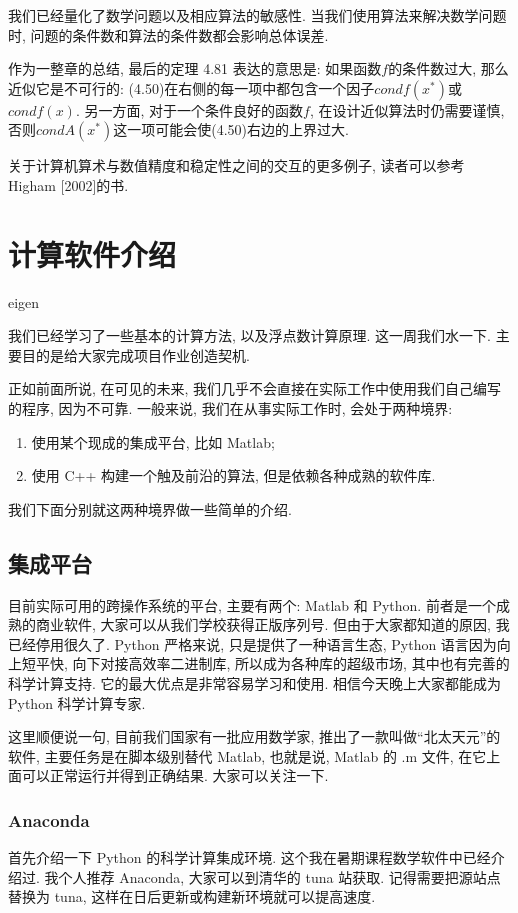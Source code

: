 \documentclass[a4paper]{ctexart}
\begin{document}
{我们已经量化了数学问题以及相应算法的敏感性. 当我们使用算法来解决数学问题时, 
问题的条件数和算法的条件数都会影响总体误差. 

作为一整章的总结, 最后的定理 4.81 表达的意思是: 如果函数$f$的条件数过大, 那么近似它是不可行的: 
(4.50)在右侧的每一项中都包含一个因子$condf(x^*)$或$condf(x)$. 另一方面, 
对于一个条件良好的函数$f$, 在设计近似算法时仍需要谨慎, 否则$condA(x^*)$这一项可能会使(4.50)右边的上界过大.

关于计算机算术与数值精度和稳定性之间的交互的更多例子, 读者可以参考Higham [2002]的书.


\section*{计算软件介绍}

eigen

我们已经学习了一些基本的计算方法, 以及浮点数计算原理. 这一周我们水一下.
主要目的是给大家完成项目作业创造契机.

正如前面所说, 在可见的未来, 我们几乎不会直接在实际工作中使用我们自己编写的程序,
因为不可靠. 一般来说, 我们在从事实际工作时, 会处于两种境界:

\begin{enumerate}
\item 使用某个现成的集成平台, 比如 Matlab;
\item 使用 C++ 构建一个触及前沿的算法, 但是依赖各种成熟的软件库.
\end{enumerate}

我们下面分别就这两种境界做一些简单的介绍.

\subsection*{集成平台}
目前实际可用的跨操作系统的平台, 主要有两个: Matlab 和 Python. 前者是一个成熟的商业软件,
大家可以从我们学校获得正版序列号. 但由于大家都知道的原因, 我已经停用很久了. Python 严格来说,
只是提供了一种语言生态, Python 语言因为向上短平快, 向下对接高效率二进制库,
所以成为各种库的超级市场, 其中也有完善的科学计算支持. 它的最大优点是非常容易学习和使用.
相信今天晚上大家都能成为 Python 科学计算专家.

这里顺便说一句, 目前我们国家有一批应用数学家, 推出了一款叫做``北太天元''的软件,
主要任务是在脚本级别替代 Matlab, 也就是说, Matlab 的 .m 文件, 在它上面可以正常运行并得到正确结果.
大家可以关注一下.

\subsubsection*{Anaconda}
首先介绍一下 Python 的科学计算集成环境. 这个我在暑期课程数学软件中已经介绍过. 我个人推荐
Anaconda, 大家可以到清华的 tuna 站获取. 记得需要把源站点替换为 tuna,
这样在日后更新或构建新环境就可以提高速度.

}
\end{document}
